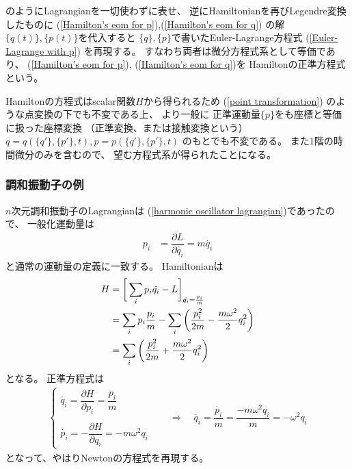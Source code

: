 のようにLagrangianを一切使わずに表せ、
逆にHamiltonianを再びLegendre変換したものに
(\ref{Hamilton's eom for p}),(\ref{Hamilton's eom for q})
の解$\{q(t)\},\{p(t)\}$を代入すると
$\{q\},\{p\}$で書いたEuler-Lagrange方程式
(\ref{Euler-Lagrange with p})
を再現する。
すなわち両者は微分方程式系として等価であり、
(\ref{Hamilton's eom for p}),
(\ref{Hamilton's eom for q})を
Hamiltonの正準方程式という。

Hamiltonの方程式はscalar関数$H$から得られるため
(\ref{point transformation})
のような点変換の下でも不変である上、
より一般に
正準運動量$\{p\}$をも座標と等価に扱った座標変換
（正準変換、または接触変換という）
$q = q(\{q'\}, \{p'\}, t ) ,
p = p(\{q'\}, \{p'\}, t )
$
のもとでも不変である。
また1階の時間微分のみを含むので、
望む方程式系が得られたことになる。

\subsubsection{調和振動子の例}

$n$次元調和振動子のLagrangianは
(\ref{harmonic oscillator lagrangian})であったので、
一般化運動量は
\begin{align}
  p_i &= \dfrac{\partial L}{\partial \dot{q_i}}
=
  m \dot{q_i}
\end{align}
と通常の運動量の定義に一致する。
Hamiltonianは
\begin{align}
  H &= \bigg[
    \sum_i p_i \dot{q_i}
    - L
    \bigg]_{ \dot{q_i} = \frac{p_i}{m} }
\notag\\&=
    \sum_i p_i \frac{p_i}{m}
    -
      \sum_i \bigg(
      \dfrac{p_i^2}{2m}
    -
      \dfrac{ m \omega^2 }{2}
      q_i^2
    \bigg)
\notag\\&=
    \sum_i \bigg(
      \dfrac{p_i^2}{2m}
    +
      \dfrac{ m \omega^2 }{2}
      q_i^2
    \bigg)
\end{align}
となる。
正準方程式は
\begin{align}
  \begin{cases}
    \dot{q_i} = \dfrac{\partial H}{\partial p_i}
    = \dfrac{p_i}{m}
  \\
  \\
    \dot{p_i} = - \dfrac{\partial H}{\partial q_i}
    = - m \omega^2 q_i
  \end{cases}
\quad
&\Rightarrow
\quad
  \ddot{q_i} = \dfrac{\dot{p_i}}{m}
  = \dfrac{- m \omega^2 q_i}{m}
  = - \omega^2 q_i
\label{hamiltonian e.o.m for harmonic oscillator}
\end{align}
となって、やはりNewtonの方程式を再現する。

